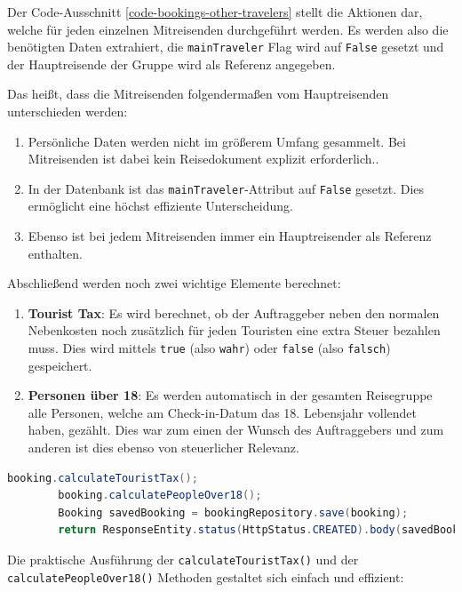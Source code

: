 	Der Code-Ausschnitt \ref{code-bookings-other-travelers} stellt die Aktionen dar, welche für jeden einzelnen Mitreisenden durchgeführt werden. Es werden also die benötigten Daten extrahiert, die \texttt{mainTraveler} Flag wird auf \texttt{False} gesetzt und der Hauptreisende der Gruppe wird als Referenz angegeben.
	
	Das heißt, dass die Mitreisenden folgendermaßen vom Hauptreisenden unterschieden werden:
	
	\begin{enumerate}
		\item Persönliche Daten werden nicht im größerem Umfang gesammelt. Bei Mitreisenden ist dabei kein Reisedokument explizit erforderlich..
		\item In der Datenbank ist das \texttt{mainTraveler}-Attribut auf \texttt{False} gesetzt. Dies ermöglicht eine höchst effiziente Unterscheidung.
		\item Ebenso ist bei jedem Mitreisenden immer ein Hauptreisender als Referenz enthalten.
	\end{enumerate}
	
	Abschließend werden noch zwei wichtige Elemente berechnet:
	\begin{enumerate}
		\item \textbf{Tourist Tax}: Es wird berechnet, ob der Auftraggeber neben den normalen Nebenkosten noch zusätzlich für jeden Touristen eine extra Steuer bezahlen muss. Dies wird mittels \texttt{true} (also \texttt{wahr}) oder \texttt{false} (also \texttt{falsch}) gespeichert.
		\item \textbf{Personen über 18}: Es werden automatisch in der gesamten Reisegruppe alle Personen, welche am Check-in-Datum das 18. Lebensjahr vollendet haben, gezählt. Dies war zum einen der Wunsch des Auftraggebers und zum anderen ist dies ebenso von steuerlicher Relevanz. 
	\end{enumerate}
	
	\begin{lstlisting}[caption={Abschließende Berechnungen, relevant für administrative Tätigkeiten.}, label={code-bookings-tourist-tax}, language=Java]
		booking.calculateTouristTax();
		booking.calculatePeopleOver18();
		Booking savedBooking = bookingRepository.save(booking);
		return ResponseEntity.status(HttpStatus.CREATED).body(savedBooking);
	\end{lstlisting}
	
	Die praktische Ausführung der \texttt{calculateTouristTax()} und der \texttt{calculatePeopleOver18()} Methoden gestaltet sich einfach und effizient:
	
